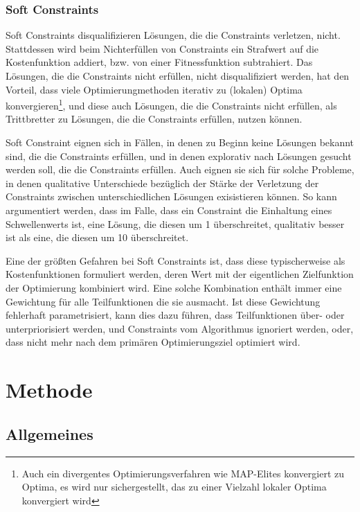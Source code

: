 \subsubsection{Soft Constraints}
Soft Constraints disqualifizieren Lösungen, die die Constraints verletzen, nicht.
Stattdessen wird beim Nichterfüllen von Constraints ein Strafwert auf die Kostenfunktion addiert, bzw. von einer Fitnessfunktion subtrahiert.
Das Lösungen, die die Constraints nicht erfüllen, nicht disqualifiziert werden, hat den Vorteil, dass viele Optimierungmethoden iterativ zu (lokalen) Optima konvergieren\footnote{Auch ein divergentes Optimierungsverfahren wie MAP-Elites konvergiert zu Optima, es wird nur sichergestellt, das zu einer Vielzahl lokaler Optima konvergiert wird}, 
und diese auch Lösungen, die die Constraints nicht erfüllen, als Trittbretter zu Lösungen, die die Constraints erfüllen, nutzen können.

Soft Constraint eignen sich in Fällen, in denen zu Beginn keine Lösungen bekannt sind, die die Constraints erfüllen, und in denen explorativ nach Lösungen gesucht werden soll, die die Constraints erfüllen.
Auch eignen sie sich für solche Probleme, in denen qualitative Unterschiede bezüglich der Stärke der Verletzung der Constraints zwischen unterschiedlichen Lösungen exisistieren können.
So kann argumentiert werden, dass im Falle, dass ein Constraint die Einhaltung eines Schwellenwerts ist, eine Lösung, die diesen um 1 überschreitet, qualitativ besser ist als eine, die diesen um 10 überschreitet.

Eine der größten Gefahren bei Soft Constraints ist, dass diese typischerweise als Kostenfunktionen formuliert werden, deren Wert mit der eigentlichen Zielfunktion der Optimierung kombiniert wird.
Eine solche Kombination enthält immer eine Gewichtung für alle Teilfunktionen die sie ausmacht.
Ist diese Gewichtung fehlerhaft parametrisiert, kann dies dazu führen, dass Teilfunktionen über- oder unterpriorisiert werden, und Constraints vom Algorithmus ignoriert werden, oder, dass nicht mehr nach dem primären Optimierungsziel optimiert wird.


\newpage

\section{Methode}

\subsection{Allgemeines}

